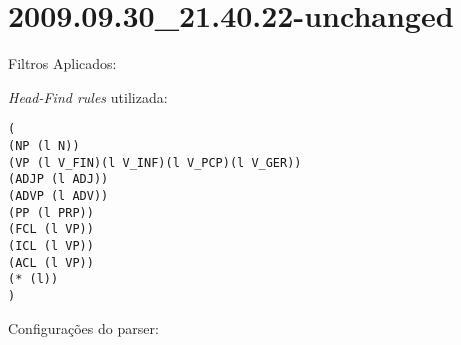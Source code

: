 \section{2009.09.30_21.40.22-unchanged} %
\label{sec:exp:2009.09.30_21.40.22-unchanged}

Filtros Aplicados:

\begin{itemize}
  
\end{itemize}

\emph{Head-Find rules} utilizada:

\scriptsize
\begin{verbatim}
(
(NP (l N))
(VP (l V_FIN)(l V_INF)(l V_PCP)(l V_GER))
(ADJP (l ADJ))
(ADVP (l ADV))
(PP (l PRP))
(FCL (l VP))
(ICL (l VP))
(ACL (l VP))
(* (l))
)

\end{verbatim}

\normalsize

Configurações do parser:

